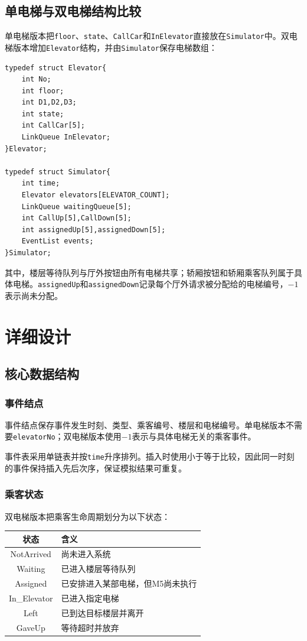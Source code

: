 \documentclass[UTF8,a4paper,12pt]{ctexart}
\begin{document}
\subsection{单电梯与双电梯结构比较}

单电梯版本把\texttt{floor}、\texttt{state}、\texttt{CallCar}和\texttt{InElevator}直接放在\texttt{Simulator}中。双电梯版本增加\texttt{Elevator}结构，并由\texttt{Simulator}保存电梯数组：

\begin{lstlisting}
typedef struct Elevator{
    int No;
    int floor;
    int D1,D2,D3;
    int state;
    int CallCar[5];
    LinkQueue InElevator;
}Elevator;

typedef struct Simulator{
    int time;
    Elevator elevators[ELEVATOR_COUNT];
    LinkQueue waitingQueue[5];
    int CallUp[5],CallDown[5];
    int assignedUp[5],assignedDown[5];
    EventList events;
}Simulator;
\end{lstlisting}

其中，楼层等待队列与厅外按钮由所有电梯共享；轿厢按钮和轿厢乘客队列属于具体电梯。\texttt{assignedUp}和\texttt{assignedDown}记录每个厅外请求被分配给的电梯编号，$-1$表示尚未分配。

\section{详细设计}

\subsection{核心数据结构}

\subsubsection{事件结点}

事件结点保存事件发生时刻、类型、乘客编号、楼层和电梯编号。单电梯版本不需要\texttt{elevatorNo}；双电梯版本使用$-1$表示与具体电梯无关的乘客事件。

事件表采用单链表并按\texttt{time}升序排列。插入时使用小于等于比较，因此同一时刻的事件保持插入先后次序，保证模拟结果可重复。

\subsubsection{乘客状态}

双电梯版本把乘客生命周期划分为以下状态：

\begin{center}
\begin{tabular}{cl}
\toprule
状态 & 含义\\
\midrule
NotArrived & 尚未进入系统\\
Waiting & 已进入楼层等待队列\\
Assigned & 已安排进入某部电梯，但M5尚未执行\\
In\_Elevator & 已进入指定电梯\\
Left & 已到达目标楼层并离开\\
GaveUp & 等待超时并放弃\\
\bottomrule
\end{tabular}
\end{center}
\end{document}
